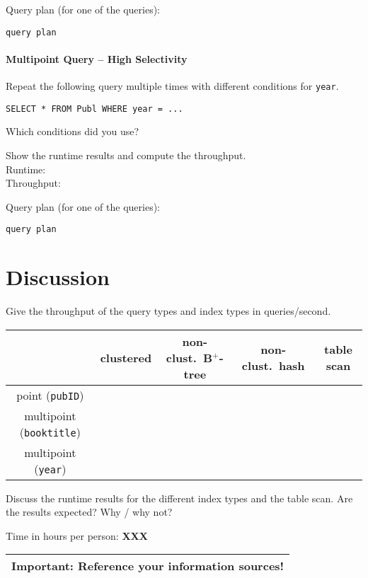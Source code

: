 \documentclass[11pt]{scrartcl}
\begin{document}
\smallskip\noindent
Query plan (for one of the queries):
{\small
\begin{verbatim}
query plan
\end{verbatim}
}


\paragraph{Multipoint Query -- High Selectivity}

Repeat the following query multiple times with different conditions for {\tt year}.

{\small
\begin{verbatim}
SELECT * FROM Publ WHERE year = ...
\end{verbatim}
}

\noindent
Which conditions did you use?

\smallskip\noindent
Show the runtime results and compute the throughput.\\
Runtime: \\
Throughput: 


\smallskip\noindent
Query plan (for one of the queries):
{\small
\begin{verbatim}
query plan
\end{verbatim}
}

\section{Discussion}

Give the throughput of the query types and index types in queries/second.
\begin{center}
  \begin{tabular}{c|c|c|c|c}
    & clustered & non-clust.\ B$^+$-tree & non-clust.\ hash & table scan \\
    \hline
    point ({\tt pubID}) & & & \\
    \hline
    multipoint ({\tt booktitle}) & & & \\
    \hline
    multipoint  ({\tt year}) & & & \\  
  \end{tabular}
\end{center}

\medskip

Discuss the runtime results for the different index types and the
table scan. Are the results expected? Why / why not?


\bigskip

\noindent Time in hours per person: {\bf XXX}

\bigskip

\begin{center}
  \begin{tabular}{c}
    \hline
    {\bf Important:} Reference your information sources!
    \\\hline
  \end{tabular}
\end{center}
\end{document}
